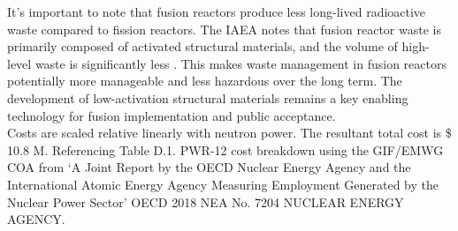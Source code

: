 It's important to note that fusion reactors produce less long-lived radioactive waste compared to fission reactors. The IAEA notes that fusion reactor waste is primarily composed of activated structural materials, and the volume of high-level waste is significantly less \cite{girard2008summary}. This makes waste management in fusion reactors potentially more manageable and less hazardous over the long term. The development of low-activation structural materials remains a key enabling technology for fusion implementation and public acceptance.\\

Costs are scaled relative linearly with neutron power. The resultant total cost is \$ 10.8 M. Referencing Table D.1. PWR-12 cost breakdown using the GIF/EMWG COA from `A Joint Report by the OECD Nuclear Energy Agency and the International Atomic Energy Agency Measuring Employment Generated by the Nuclear Power Sector'  OECD 2018 NEA No. 7204 NUCLEAR ENERGY AGENCY.

